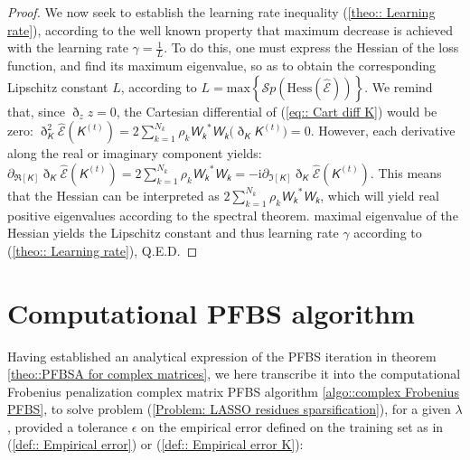 \documentclass{article}
\newcommand{\mat}[1]{\bm{\mathsfit{#1}}}
\begin{document}
\begin{proof}
We now seek to establish the learning rate inequality (\ref{theo:: Learning rate}), according to the well known property that maximum decrease is achieved with the learning rate $\gamma = \frac{1}{L}$.
To do this, one must express the Hessian of the loss function, and find its maximum eigenvalue, so as to obtain the corresponding Lipschitz constant $L$, according to $L = \mathrm{max}\left\{ \mathcal{S}p\left( \mathrm{Hess}\left( \widehat{\mathcal{E}}\right)\right) \right\}$.
We remind that, since $\eth_z z = 0$, the Cartesian differential of (\ref{eq:: Cart diff K}) would be zero: $ \eth^2_{\mat{K}}\widehat{\mathcal{E}}\left(\mat{K}^{(t)} \right) = 2 \sum_{k=1}^{N_k} \rho_k \mat{W_k}^* \mat{W_k} \Big( \eth_{\mat{K}}\mat{K}^{(t)} \Big) = 0$. However, each derivative along the real or imaginary component yields: $ \partial_{\Re[\mat{K}]}\eth_{\mat{K}}\widehat{\mathcal{E}}\left(\mat{K}^{(t)} \right)  =  2 \sum_{k=1}^{N_k} \rho_k \mat{W_k}^* \mat{W_k} = -\mathrm{i} \partial_{\Im[\mat{K}]}\eth_{\mat{K}}\widehat{\mathcal{E}}\left(\mat{K}^{(t)} \right) $. This means that the Hessian can be interpreted as $2 \sum_{k=1}^{N_k} \rho_k \mat{W_k}^* \mat{W_k}$, which will yield real positive eigenvalues according to the spectral theorem. maximal eigenvalue of the Hessian yields the Lipschitz constant and thus learning rate $\gamma$ according to (\ref{theo:: Learning rate}), Q.E.D.
\end{proof}



\section{Computational PFBS algorithm}

Having established an analytical expression of the PFBS iteration in theorem \ref{theo::PFBSA for complex matrices}, we here transcribe it into the computational Frobenius penalization complex matrix PFBS algorithm \ref{algo::complex Frobenius PFBS}, to solve problem (\ref{Problem: LASSO residues sparsification}), for a given $\lambda$, provided a tolerance $\epsilon$ on the empirical error defined on the training set as in (\ref{def:: Empirical error}) or (\ref{def:: Empirical error K}):
\end{document}
